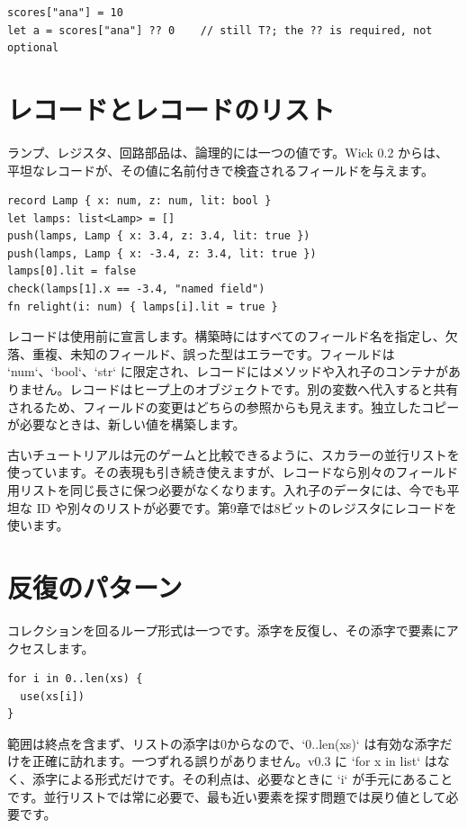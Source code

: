 \begin{lstlisting}[language=wick]
scores["ana"] = 10
let a = scores["ana"] ?? 0    // still T?; the ?? is required, not optional
\end{lstlisting}

\section{レコードとレコードのリスト}

ランプ、レジスタ、回路部品は、論理的には一つの値です。Wick 0.2 からは、平坦なレコードが、その値に名前付きで検査されるフィールドを与えます。

\begin{lstlisting}[language=wick]
record Lamp { x: num, z: num, lit: bool }
let lamps: list<Lamp> = []
push(lamps, Lamp { x: 3.4, z: 3.4, lit: true })
push(lamps, Lamp { x: -3.4, z: 3.4, lit: true })
lamps[0].lit = false
check(lamps[1].x == -3.4, "named field")
fn relight(i: num) { lamps[i].lit = true }
\end{lstlisting}

レコードは使用前に宣言します。構築時にはすべてのフィールド名を指定し、欠落、重複、未知のフィールド、誤った型はエラーです。フィールドは `num`、`bool`、`str` に限定され、レコードにはメソッドや入れ子のコンテナがありません。レコードはヒープ上のオブジェクトです。別の変数へ代入すると共有されるため、フィールドの変更はどちらの参照からも見えます。独立したコピーが必要なときは、新しい値を構築します。

古いチュートリアルは元のゲームと比較できるように、スカラーの並行リストを使っています。その表現も引き続き使えますが、レコードなら別々のフィールド用リストを同じ長さに保つ必要がなくなります。入れ子のデータには、今でも平坦な ID や別々のリストが必要です。第9章では8ビットのレジスタにレコードを使います。

\section{反復のパターン}

コレクションを回るループ形式は一つです。添字を反復し、その添字で要素にアクセスします。

\begin{lstlisting}[language=wick]
for i in 0..len(xs) {
  use(xs[i])
}
\end{lstlisting}

\noindent
範囲は終点を含まず、リストの添字は0からなので、`0..len(xs)` は有効な添字だけを正確に訪れます。一つずれる誤りがありません。v0.3 に `for x in list` はなく、添字による形式だけです。その利点は、必要なときに `i` が手元にあることです。並行リストでは常に必要で、最も近い要素を探す問題では戻り値として必要です。

